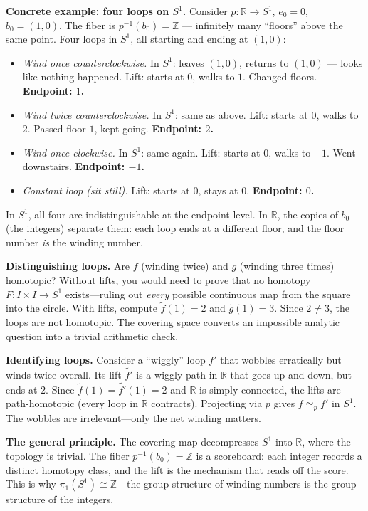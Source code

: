 \documentclass[11pt]{report}
\begin{document}
\begin{rembox}
\textbf{Concrete example: four loops on $S^1$.} Consider $p: \mathbb{R} \to S^1$, $e_0 = 0$, $b_0 = (1,0)$. The fiber is $p^{-1}(b_0) = \mathbb{Z}$ --- infinitely many ``floors'' above the same point. Four loops in $S^1$, all starting and ending at $(1,0)$:
\begin{itemize}[nosep]
    \item \textit{Wind once counterclockwise.} In $S^1$: leaves $(1,0)$, returns to $(1,0)$ --- looks like nothing happened. Lift: starts at $0$, walks to $1$. Changed floors. \textbf{Endpoint: $1$.}
    \item \textit{Wind twice counterclockwise.} In $S^1$: same as above. Lift: starts at $0$, walks to $2$. Passed floor $1$, kept going. \textbf{Endpoint: $2$.}
    \item \textit{Wind once clockwise.} In $S^1$: same again. Lift: starts at $0$, walks to $-1$. Went downstairs. \textbf{Endpoint: $-1$.}
    \item \textit{Constant loop (sit still).} Lift: starts at $0$, stays at $0$. \textbf{Endpoint: $0$.}
\end{itemize}
In $S^1$, all four are indistinguishable at the endpoint level. In $\mathbb{R}$, the copies of $b_0$ (the integers) separate them: each loop ends at a different floor, and the floor number \emph{is} the winding number.

\textbf{Distinguishing loops.} Are $f$ (winding twice) and $g$ (winding three times) homotopic? Without lifts, you would need to prove that no homotopy $F: I \times I \to S^1$ exists---ruling out \emph{every} possible continuous map from the square into the circle. With lifts, compute $\tilde{f}(1) = 2$ and $\tilde{g}(1) = 3$. Since $2 \neq 3$, the loops are not homotopic. The covering space converts an impossible analytic question into a trivial arithmetic check.

\textbf{Identifying loops.} Consider a ``wiggly'' loop $f'$ that wobbles erratically but winds twice overall. Its lift $\tilde{f'}$ is a wiggly path in $\mathbb{R}$ that goes up and down, but ends at $2$. Since $\tilde{f}(1) = \tilde{f'}(1) = 2$ and $\mathbb{R}$ is simply connected, the lifts are path-homotopic (every loop in $\mathbb{R}$ contracts). Projecting via $p$ gives $f \simeq_p f'$ in $S^1$. The wobbles are irrelevant---only the net winding matters.

\textbf{The general principle.} The covering map decompresses $S^1$ into $\mathbb{R}$, where the topology is trivial. The fiber $p^{-1}(b_0) = \mathbb{Z}$ is a scoreboard: each integer records a distinct homotopy class, and the lift is the mechanism that reads off the score. This is why $\pi_1(S^1) \cong \mathbb{Z}$---the group structure of winding numbers is the group structure of the integers.
\end{rembox}
\end{document}
